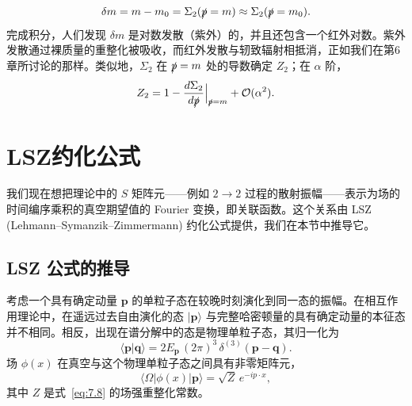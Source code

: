 \begin{equation}
  \delta m = m - m_0 = \Sigma_2(\slashed{p}=m) \approx \Sigma_2(\slashed{p}=m_0) .
  \label{eq:7.27}
\end{equation}
完成积分，人们发现 $\delta m$ 是对数发散（紫外）的，并且还包含一个红外对数。紫外发散通过裸质量的重整化被吸收，而红外发散与轫致辐射相抵消，正如我们在第6章所讨论的那样。类似地，$\Sigma_2$ 在 $\slashed{p} = m$ 处的导数确定 $Z_2$；在 $\alpha$ 阶，
\begin{equation}
  Z_2 = 1 - \frac{d\Sigma_2}{d\slashed{p}}\Big|_{\slashed{p}=m}
    + \mathcal{O}(\alpha^2) .
  \label{eq:7.29}
\end{equation}

\section{LSZ约化公式}

我们现在想把理论中的 $S$ 矩阵元——例如 $2\to2$ 过程的散射振幅——表示为场的时间编序乘积的真空期望值的 Fourier 变换，即关联函数。这个关系由 LSZ
(Lehmann--Symanzik--Zimmermann) 约化公式提供，我们在本节中推导它。%

\subsection*{LSZ 公式的推导}

考虑一个具有确定动量 $\mathbf{p}$ 的单粒子态在较晚时刻演化到同一态的振幅。在相互作用理论中，在遥远过去自由演化的态 $|\mathbf{p}\rangle$ 与完整哈密顿量的具有确定动量的本征态并不相同。相反，出现在谱分解中的态是物理单粒子态，其归一化为
\begin{equation}
  \langle\mathbf{p}|\mathbf{q}\rangle = 2E_{\mathbf{p}}\,(2\pi)^3\,
    \delta^{(3)}(\mathbf{p}-\mathbf{q}) .
\end{equation}
场 $\phi(x)$ 在真空与这个物理单粒子态之间具有非零矩阵元，
\begin{equation}
  \langle\Omega|\phi(x)|\mathbf{p}\rangle = \sqrt{Z}\,
    e^{-ip\cdot x},
  \label{eq:7.35}
\end{equation}
其中 $Z$ 是式~\eqref{eq:7.8} 的场强重整化常数。

